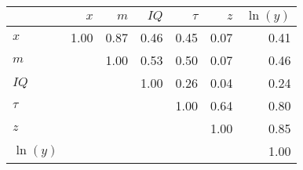 \begin{tabular}{lrrrrrr}
\hline
 & $x$  & $m$  & $IQ$  & $\tau$  & $z$  & $\ln(y)$  \\ 
\hline
$x$ & 1.00  & 0.87  & 0.46  & 0.45  & 0.07  & 0.41  \\ 
$m$ &   & 1.00  & 0.53  & 0.50  & 0.07  & 0.46  \\ 
$IQ$ &   &   & 1.00  & 0.26  & 0.04  & 0.24  \\ 
$\tau$ &   &   &   & 1.00  & 0.64  & 0.80  \\ 
$z$ &   &   &   &   & 1.00  & 0.85  \\ 
$\ln(y)$ &   &   &   &   &   & 1.00  \\ 
\hline
\end{tabular}%

